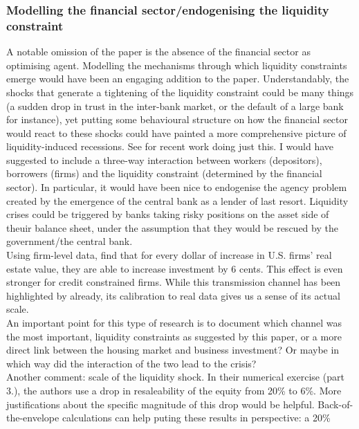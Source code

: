 \documentclass{amsart}
\theoremstyle{definition}
\theoremstyle{remark}
\numberwithin{equation}{section}
\begin{document}
\subsubsection*{Modelling the financial sector/endogenising the liquidity constraint} A notable omission of the paper is the absence of the financial sector as optimising agent. Modelling the mechanisms through which liquidity constraints emerge would have been an engaging addition to the paper. Understandably, the shocks that generate a tightening of the liquidity constraint could be many things (a sudden drop in trust in the inter-bank market, or the default of a large bank for instance), yet putting some behavioural structure on how the financial sector would react to these shocks could have painted a more comprehensive picture of liquidity-induced recessions. See \cite{he2013intermediary, angeloni2013capital, gertler2010financial} for recent work doing just this. I would have suggested to include a three-way interaction between workers (depositors), borrowers (firms) and the liquidity constraint (determined by the financial sector). In particular, it would have been nice to endogenise the agency problem created by the emergence of the central bank as a lender of last resort. Liquidity crises could be triggered by banks taking risky positions on the asset side of theuir balance sheet, under the assumption that they would be rescued by the government/the central bank.\\     

Using firm-level data, \cite{chaney2012collateral} find that for every dollar of increase in U.S. firms' real estate value, they are able to increase investment by 6 cents. This effect is even stronger for credit constrained firms. While this transmission channel has been highlighted by \cite{kiyotaki1997credit} already, its calibration to real data gives us a sense of its actual scale. \\

An important point for this type of research is to document which channel was the most important, liquidity constraints as suggested by this paper, or a more direct link between the housing market and business investment? Or maybe in which way did the interaction of the two lead to the crisis?\\

Another comment: scale of the liquidity shock. In their numerical exercise (part 3.), the authors use a drop in resaleability of the equity from 20\% to 6\%. More justifications about the specific magnitude of this drop would be helpful. Back-of-the-envelope calculations can help puting these results in perspective: a 20\% \\
\end{document}
